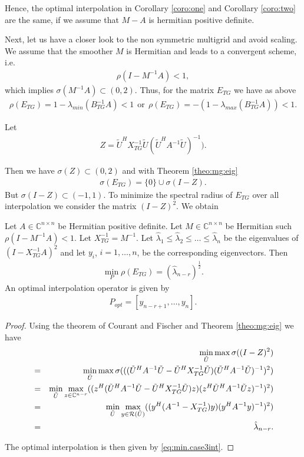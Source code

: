 \documentclass[final]{siamltex}
\newcommand{\beqo}{\begin{eqnarray*}}
\newcommand{\beq}{\begin{eqnarray}}
\newcommand{\eeqo}{\end{eqnarray*}}
\newcommand{\eeq}{\end{eqnarray}}
\numberwithin{equation}{section}
\newcommand{\ran} {{\cal R}}
\newcommand{\bC}{\mathbb{C}}
\newcommand{\inCnn}{\in \mathbb{C}^{n \times n}}
\begin{document}
Hence, the optimal interpolation in Corollary \ref{coro:one}  and Corollary
\ref{coro:two} are the same, if we assume that $M - A$ is hermitian positive
definite.

Next, let us have  a closer look to the non symmetric multigrid and avoid
scaling. We assume  that
the smoother $M$ is Hermitian  and  leads to a convergent scheme, i.e.
\beq  \label{eq:smoother:con:}
\rho(I - M^{-1}A) < 1, 
\eeq
which implies $\sigma(M^{-1}A) \subset (0,2).$ Thus, for the matrix $E_{TG}$
we have as above
\beqo
\rho(E_{TG}) = 1 - \lambda_{min}(B_{TG}^{-1}A) < 1 
\ \ \mbox{or} \ \
\rho(E_{TG}) = -(1 - \lambda_{max}(B_{TG}^{-1}A)) < 1.
\eeqo

Let 
\beqo
Z = \tilde U^HX_{TG}^{-1}\tilde U (\tilde U^HA^{-1}\tilde U)^{-1}).
\eeqo

Then we have $\sigma(Z) \subset (0,2)$ and with  Theorem \ref{theo:mg:eig}
\beqo
\sigma(E_{TG}) = \{0\} \cup \sigma(I-Z).
\eeqo
But $\sigma(I-Z) \subset (-1,1) $. To minimize the spectral radius of $E_{TG}$
over all interpolation we consider the matrix $(I - Z)^2$. We  obtain



\begin{theorem} \label{theo:main2}
Let  $A\inCnn$  be Hermitian positive definite. Let $ M \inCnn$ be Hermitian
such $\rho(I - M^{-1}A) < 1$.
Let $X_{TG}^{-1} =  M^{-1}$.   
 Let $
\hat \lambda_1 \leq \hat \lambda_2 \leq \ldots \leq  \hat \lambda_n $
be the  eigenvalues of $(I - X_{TG}^{-1}A)^2$  and let $y_i$, $i = 1, \ldots,
n$, be the corresponding eigenvectors. Then
\beq \label{eq:min.case3}
\min_{P}\rho(E_{TG}) = (\hat \lambda_{n-r})^{\frac{1}{2}}.
\eeq
An optimal interpolation operator is given by 
\beq  \label{eq:min.case3int}
P_{opt} = [y_{n-r+1}, \ldots , y_n].
\eeq
\end{theorem}
\begin{proof}
Using the theorem of Courant and Fischer and Theorem \ref{theo:mg:eig} we have
\beqo
& & \min_{\tilde U} \max \sigma((I - Z)^2) \\
& = & \min_{\tilde U} \max \sigma( ((\tilde U^HA^{-1}\tilde U - \tilde
U^HX_{TG}^{-1}\tilde U) (\tilde U^HA^{-1}\tilde U)^{-1})^2)\\
& = & \min_{\tilde U} \max_{z \in \bC ^{n-r}}  ((z^H(\tilde U^HA^{-1}\tilde U -
\tilde U^HX_{TG}^{-1}\tilde U)z) (z^H\tilde U^HA^{-1}\tilde Uz)^{-1})^2)\\
& = & \min_{\tilde U} \max_{y \in \ran (\tilde U)}  ((y^H(A^{-1} -
X_{TG}^{-1})y) (y^HA^{-1}y)^{-1})^2)\\
& = & \hat \lambda_{n-r}.
\eeqo
  
The optimal interpolation is then given by \eqref{eq:min.case3int}.
\end{proof}
\end{document}
